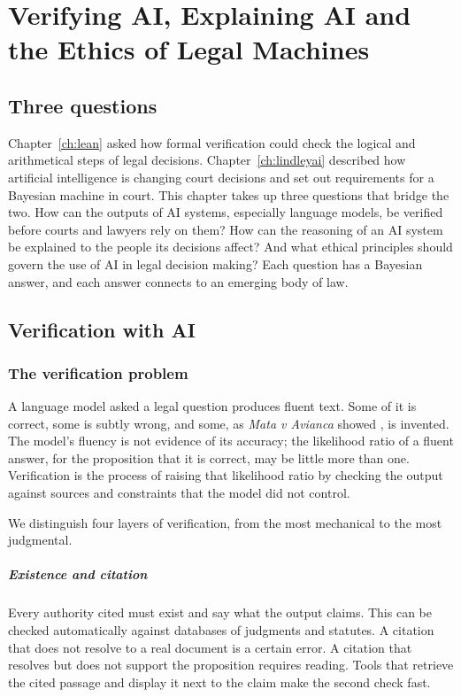 \chapter{Verifying AI, Explaining AI and the Ethics of Legal Machines}
\label{ch:xai}

\section{Three questions}

Chapter~\ref{ch:lean} asked how formal verification could check the logical and arithmetical steps of legal decisions. Chapter~\ref{ch:lindleyai} described how artificial intelligence is changing court decisions and set out requirements for a Bayesian machine in court. This chapter takes up three questions that bridge the two. How can the outputs of AI systems, especially language models, be verified before courts and lawyers rely on them? How can the reasoning of an AI system be explained to the people its decisions affect? And what ethical principles should govern the use of AI in legal decision making? Each question has a Bayesian answer, and each answer connects to an emerging body of law.

\section{Verification with AI}

\subsection{The verification problem}

A language model asked a legal question produces fluent text. Some of it is correct, some is subtly wrong, and some, as \emph{Mata v Avianca} showed \citep{mata2023}, is invented. The model's fluency is not evidence of its accuracy; the likelihood ratio of a fluent answer, for the proposition that it is correct, may be little more than one. Verification is the process of raising that likelihood ratio by checking the output against sources and constraints that the model did not control.

We distinguish four layers of verification, from the most mechanical to the most judgmental.

\paragraph{Existence and citation} Every authority cited must exist and say what the output claims. This can be checked automatically against databases of judgments and statutes. A citation that does not resolve to a real document is a certain error. A citation that resolves but does not support the proposition requires reading. Tools that retrieve the cited passage and display it next to the claim make the second check fast.

